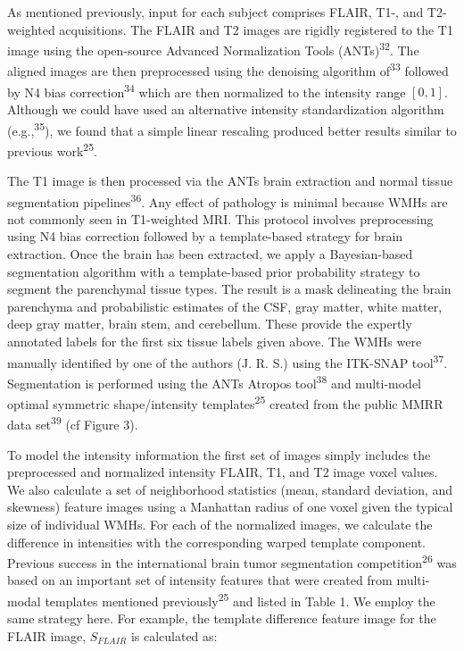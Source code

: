 \documentclass[11pt,]{article}
\begin{document}
As mentioned previously, input for each subject comprises FLAIR, T1-,
and T2-weighted acquisitions. The FLAIR and T2 images are rigidly
registered to the T1 image using the open-source Advanced Normalization
Tools (ANTs)\textsuperscript{32}. The aligned images are then
preprocessed using the denoising algorithm of\textsuperscript{33}
followed by N4 bias correction\textsuperscript{34} which are then
normalized to the intensity range \([0,1]\). Although we could have used
an alternative intensity standardization algorithm
(e.g.,\textsuperscript{35}), we found that a simple linear rescaling
produced better results similar to previous work\textsuperscript{25}.

The T1 image is then processed via the ANTs brain extraction and normal
tissue segmentation pipelines\textsuperscript{36}. Any effect of
pathology is minimal because WMHs are not commonly seen in T1-weighted
MRI. This protocol involves preprocessing using N4 bias correction
followed by a template-based strategy for brain extraction. Once the
brain has been extracted, we apply a Bayesian-based segmentation
algorithm with a template-based prior probability strategy to segment
the parenchymal tissue types. The result is a mask delineating the brain
parenchyma and probabilistic estimates of the CSF, gray matter, white
matter, deep gray matter, brain stem, and cerebellum. These provide the
expertly annotated labels for the first six tissue labels given above.
The WMHs were manually identified by one of the authors (J. R. S.) using
the ITK-SNAP tool\textsuperscript{37}. Segmentation is performed using
the ANTs Atropos tool\textsuperscript{38} and multi-model optimal
symmetric shape/intensity templates\textsuperscript{25} created from the
public MMRR data set\textsuperscript{39} (cf Figure 3).

To model the intensity information the first set of images simply
includes the preprocessed and normalized intensity FLAIR, T1, and T2
image voxel values. We also calculate a set of neighborhood statistics
(mean, standard deviation, and skewness) feature images using a
Manhattan radius of one voxel given the typical size of individual WMHs.
For each of the normalized images, we calculate the difference in
intensities with the corresponding warped template component. Previous
success in the international brain tumor segmentation
competition\textsuperscript{26} was based on an important set of
intensity features that were created from multi-modal templates
mentioned previously\textsuperscript{25} and listed in Table 1. We
employ the same strategy here. For example, the template difference
feature image for the FLAIR image, \(S_{FLAIR}\) is calculated as:
\end{document}
